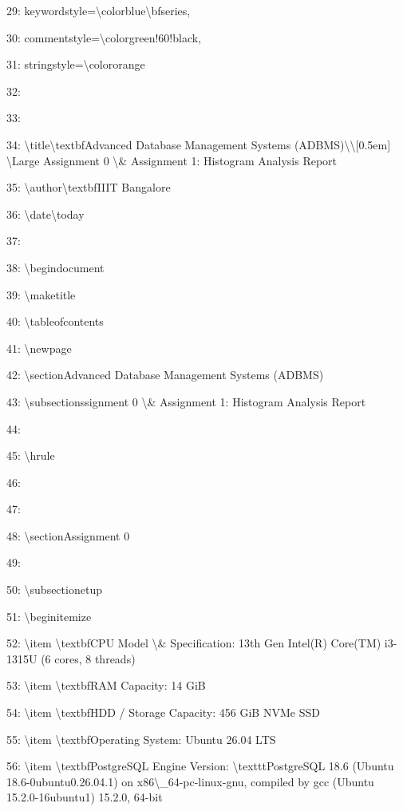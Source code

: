 \documentclass[11pt,a4paper]{article}
\begin{document}
{{29:     keywordstyle=\textbackslash{}color{blue}\textbackslash{}bfseries,

30:     commentstyle=\textbackslash{}color{green!60!black},

31:     stringstyle=\textbackslash{}color{orange}

32: }

33:

34: \textbackslash{}title{\textbackslash{}textbf{Advanced Database Management Systems (ADBMS)}\textbackslash{}\textbackslash{}[0.5em] \textbackslash{}Large Assignment 0 \textbackslash{}\& Assignment 1: Histogram Analysis Report}

35: \textbackslash{}author{\textbackslash{}textbf{IIIT Bangalore}}

36: \textbackslash{}date{\textbackslash{}today}

37:

38: \textbackslash{}begin{document}

39: \textbackslash{}maketitle

40: \textbackslash{}tableofcontents

41: \textbackslash{}newpage

42: \textbackslash{}section{Advanced Database Management Systems (ADBMS)}

43: \textbackslash{}subsection{ssignment 0 \textbackslash{}\& Assignment 1: Histogram Analysis Report}

44:

45: \textbackslash{}hrule

46:

47:

48: \textbackslash{}section{Assignment 0}

49:

50: \textbackslash{}subsection{etup}

51: \textbackslash{}begin{itemize}

52: \textbackslash{}item \textbackslash{}textbf{CPU Model \textbackslash{}\& Specification}: 13th Gen Intel(R) Core(TM) i3-1315U (6 cores, 8 threads)

53: \textbackslash{}item \textbackslash{}textbf{RAM Capacity}: 14 GiB

54: \textbackslash{}item \textbackslash{}textbf{HDD / Storage Capacity}: 456 GiB NVMe SSD

55: \textbackslash{}item \textbackslash{}textbf{Operating System}: Ubuntu 26.04 LTS

56: \textbackslash{}item \textbackslash{}textbf{PostgreSQL Engine Version}: \textbackslash{}texttt{PostgreSQL 18.6 (Ubuntu 18.6-0ubuntu0.26.04.1) on x86\textbackslash{}\_64-pc-linux-gnu, compiled by gcc (Ubuntu 15.2.0-16ubuntu1) 15.2.0, 64-bit}

}
\end{document}
